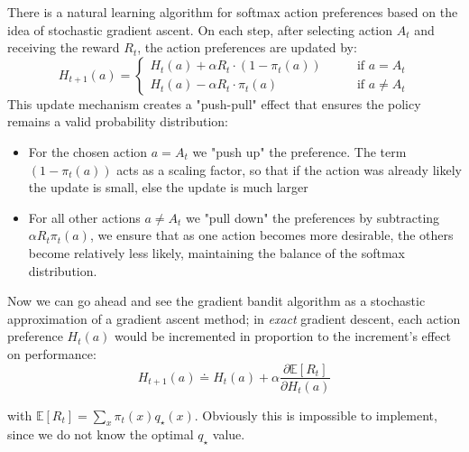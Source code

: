 There is a natural learning algorithm for softmax action preferences based on the idea of stochastic gradient ascent. On each step, after selecting action $A_t$ and receiving the reward $R_t$, the action preferences are updated by:
\begin{equation}
    H_{t+1}(a) =
    \begin{cases}
        H_t(a) + \alpha R_t \cdot (1 - \pi_t(a)) &\qquad \text{if } a=A_t \\
        H_t(a) - \alpha R_t \cdot \pi_t(a) &\qquad \text{if } a \neq A_t
    \end{cases}
\end{equation}
This update mechanism creates a "push-pull" effect that ensures the policy remains a valid probability distribution:
\begin{itemize}
    \item For the chosen action $a=A_t$ we "push up" the preference. The term $(1-\pi_t(a))$ acts as a scaling factor, so that if the action was already likely the update is small, else the update is much larger
    \item For all other actions $a \neq A_t$ we "pull down" the preferences by subtracting $\alpha R_t \pi_t(a)$, we ensure that as one action becomes more desirable, the others become relatively less likely, maintaining the balance of the softmax distribution.
\end{itemize}

Now we can go ahead and see the gradient bandit algorithm as a stochastic approximation of a gradient ascent method; in \textit{exact} gradient descent, each action preference $H_t(a)$ would be incremented in proportion to the increment's effect on performance:
\[
    H_{t+1}(a) \doteq H_t(a) + \alpha \frac{\partial \mathbb{E}[R_t]}{\partial H_t(a)}
\]

with $\mathbb{E}[R_t] = \sum_x \pi_t(x) q_\star(x)$. Obviously this is impossible to implement, since we do not know the optimal $q_\star$ value.

